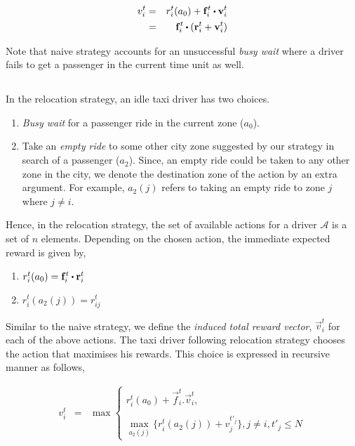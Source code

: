 \begin{eqnarray}
v_{i}^{t} &=& r_{i}^{t}(a_0) + \vec{f}_{i}^{t} \bigcdot \vec{v}_{i}^{t} \nonumber \\
&=& \vec{f}_{i}^{t} \bigcdot (\vec{r}_{i}^{t} + \vec{v}_{i}^{t})
\end{eqnarray}

Note that naive strategy accounts for an unsuccessful \textit{busy wait} where a driver fails to get a passenger in the current time unit as well.

\subsection{\relocation}
In the relocation strategy, an idle taxi driver has two choices. 

\begin{enumerate}
    \item \textit{Busy wait} for a passenger ride in the current zone ($a_0$).
    \item Take an \textit{empty ride} to some other city zone suggested by our strategy in search of a passenger ($a_2$). Since, an empty ride could be taken to any other zone in the city, we denote the destination zone of the action by an extra argument. For example, $a_2(j)$ refers to taking an empty ride to zone $j$ where $j \neq i$.
\end{enumerate}

Hence, in the relocation strategy, the set of available actions for a driver $\mathcal{A}$ is a set of $n$ elements. Depending on the chosen action, the immediate expected reward is given by,

\begin{enumerate}
    \item $r_{i}^{t}(a_0) = \vec{f}_{i}^{t} \bigcdot \vec{r}_{i}^{t}$ \\
    \item $r_{i}^{t}(a_2(j)) = r_{ij}^{t}$
\end{enumerate}

Similar to the naive strategy, we define the \textit{induced total reward vector}, $\vec{v}_i^{t}$ for each of the above actions. The taxi driver following relocation strategy chooses the action that maximises his rewards. This choice is expressed in recursive manner as follows,

\begin{eqnarray}
v_{i}^{t} &=& \max
    \begin{cases}
    r_{i}^{t}(a_0) + \vec{f}_{i}^{t}.\vec{v}_{i}^{t}, \\ \\
    \max_{a_2(j)} \bigg\{r_{i}^{t}(a_2(j)) + v_{j}^{t'_j}\bigg\}, j \neq i, t'_{j} \leq N
    \end{cases}
\end{eqnarray}

